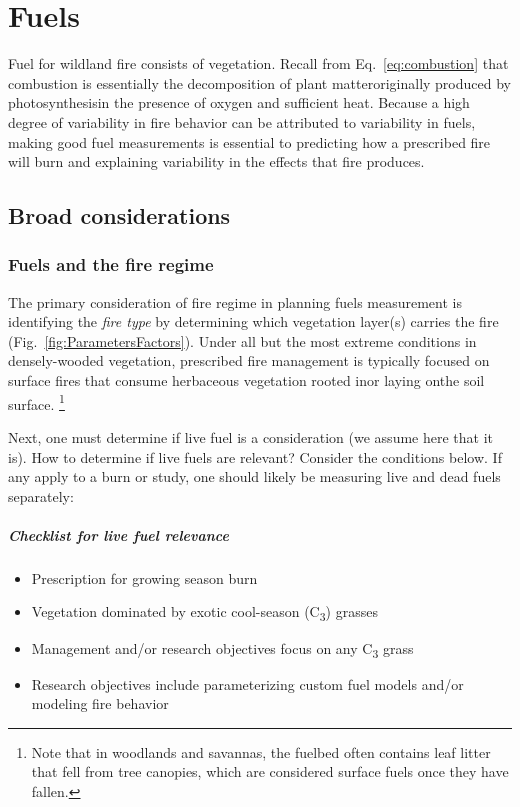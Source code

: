 \chapter{Fuels} 
\label{ch:fuels}

Fuel for wildland fire consists of vegetation. 
Recall from Eq.~\ref{eq:combustion} that combustion is essentially the decomposition of plant matter\textemdash originally produced by photosynthesis\textemdash in the presence of oxygen and sufficient heat. 
Because a high degree of variability in fire behavior can be attributed to variability in fuels, making good fuel measurements is essential to predicting how a prescribed fire will burn and explaining variability in the effects that fire produces. 

\section{Broad considerations}

\subsection{Fuels and the fire regime}

The primary consideration of fire regime in planning fuels measurement is identifying the \emph{fire type} by determining which vegetation layer(s) carries the fire (Fig.~\ref{fig:ParametersFactors}). 
Under all but the most extreme conditions in densely-wooded vegetation, prescribed fire management is typically focused on surface fires that consume herbaceous vegetation rooted in\textemdash or laying on\textemdash the soil surface. 
\footnote{Note that in woodlands and savannas, the fuelbed often contains leaf litter that fell from tree canopies, which are considered surface fuels once they have fallen.}

Next, one must determine if live fuel is a consideration (we assume here that it is). 
How to determine if live fuels are relevant? 
Consider the conditions below. 
If any apply to a burn or study, one should likely be measuring live and dead fuels separately: 

\paragraph{Checklist for live fuel relevance} 
\begin{itemize}[noitemsep]
	\item[{\color{BisonGreen!80}\ding{51}}] Prescription for growing season burn
	\item[{\color{BisonGreen!80}\ding{51}}] Vegetation dominated by exotic cool-season (C\textsubscript{3}) grasses
	\item[{\color{BisonGreen!80}\ding{51}}] Management and/or research objectives focus on any C\textsubscript{3} grass
	\item[{\color{BisonGreen!80}\ding{51}}] Research objectives include parameterizing custom fuel models and/or modeling fire behavior  
\end{itemize}

